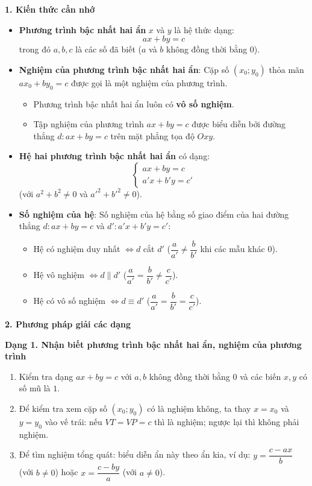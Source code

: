 \textbf{1. Kiến thức cần nhớ}
\begin{itemize}
\item \textbf{Phương trình bậc nhất hai ẩn} $x$ và $y$ là hệ thức dạng:
$$\boxed{ax + by = c}$$
trong đó $a, b, c$ là các số đã biết ($a$ và $b$ không đồng thời bằng $0$).
\item \textbf{Nghiệm của phương trình bậc nhất hai ẩn}: Cặp số $(x_0; y_0)$ thỏa mãn $ax_0 + by_0 = c$ được gọi là một nghiệm của phương trình.
\begin{itemize}
\item Phương trình bậc nhất hai ẩn luôn có \textbf{vô số nghiệm}.
\item Tập nghiệm của phương trình $ax + by = c$ được biểu diễn bởi đường thẳng $d\colon ax + by = c$ trên mặt phẳng tọa độ $Oxy$.
\end{itemize}
\item \textbf{Hệ hai phương trình bậc nhất hai ẩn} có dạng:
$$\boxed{\begin{cases} ax + by = c \\ a'x + b'y = c' \end{cases}}$$
(với $a^2 + b^2 \ne 0$ và $a'^2 + b'^2 \ne 0$).
\item \textbf{Số nghiệm của hệ}: Số nghiệm của hệ bằng số giao điểm của hai đường thẳng $d\colon ax + by = c$ và $d'\colon a'x + b'y = c'$:
\begin{itemize}
\item Hệ có nghiệm duy nhất $\iff d$ cắt $d'$ ($\dfrac{a}{a'} \ne \dfrac{b}{b'}$ khi các mẫu khác $0$).
\item Hệ vô nghiệm $\iff d \parallel d'$ ($\dfrac{a}{a'} = \dfrac{b}{b'} \ne \dfrac{c}{c'}$).
\item Hệ có vô số nghiệm $\iff d \equiv d'$ ($\dfrac{a}{a'} = \dfrac{b}{b'} = \dfrac{c}{c'}$).
\end{itemize}
\end{itemize}

\textbf{2. Phương pháp giải các dạng}

\textbf{Dạng 1. Nhận biết phương trình bậc nhất hai ẩn, nghiệm của phương trình}
\begin{enumerate}
\item Kiểm tra dạng $ax + by = c$ với $a, b$ không đồng thời bằng $0$ và các biến $x, y$ có số mũ là $1$.
\item Để kiểm tra xem cặp số $(x_0; y_0)$ có là nghiệm không, ta thay $x = x_0$ và $y = y_0$ vào vế trái: nếu $VT = VP = c$ thì là nghiệm; ngược lại thì không phải nghiệm.
\item Để tìm nghiệm tổng quát: biểu diễn ẩn này theo ẩn kia, ví dụ: $y = \dfrac{c - ax}{b}$ (với $b \ne 0$) hoặc $x = \dfrac{c - by}{a}$ (với $a \ne 0$).
\end{enumerate}

